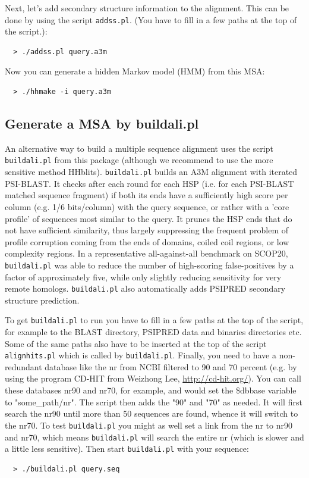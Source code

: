 \documentclass[11pt,a4paper]{article}
\begin{document}
Next, let's add secondary structure information to the alignment. This can be 
done by using the script \verb`addss.pl`. (You have to fill in a few paths at the top of the 
script.):

\begin{verbatim}
  > ./addss.pl query.a3m
\end{verbatim}

Now you can generate a hidden Markov model (HMM) from this MSA:
\begin{verbatim}
  > ./hhmake -i query.a3m
\end{verbatim}

\subsection{Generate a MSA by buildali.pl}

An alternative way to build a multiple sequence alignment uses the script \verb`buildali.pl` from this package (although we recommend to use
the more sensitive method HHblits). \verb`buildali.pl` builds an A3M alignment 
with iterated PSI-BLAST. It checks after each round for each HSP (i.e. for each PSI-BLAST 
matched sequence fragment) if both its ends have a sufficiently high score per column 
(e.g. 1/6 bits/column) with the query sequence, or rather with a 'core profile' of sequences 
most similar to the query. It prunes the HSP ends that do not have sufficient similarity, 
thus largely suppressing the frequent problem of profile corruption coming from the ends of 
domains, coiled coil regions, or low complexity regions. In a representative all-against-all 
benchmark on SCOP20, \verb`buildali.pl` was able to reduce the number of high-scoring 
false-positives by a factor of approximately five, while only slightly reducing sensitivity 
for very remote homologs. \verb`buildali.pl` also automatically adds PSIPRED secondary structure 
prediction. 

To get \verb`buildali.pl` to run you have to fill in a few paths at the top of the script, 
for example to the BLAST directory, PSIPRED data and binaries directories etc. Some of 
the same paths also have to be inserted at the top of the script \verb`alignhits.pl` which 
is called by \verb`buildali.pl`. Finally, you need to have a non-redundant database like the 
nr from NCBI filtered to 90 and 70 percent (e.g. by using the program CD-HIT from 
Weizhong Lee, \url{http://cd-hit.org/}). You can call these databases nr90 and nr70, for 
example, and would set the \$dbbase variable to "some\_path/nr". The script then adds 
the "90" and "70" as needed. It will first search the nr90 until more than 50 
sequences are found, whence it will switch to the nr70. To test \verb`buildali.pl` you might 
as well set a link from the nr to nr90 and nr70, which means \verb`buildali.pl` will search 
the entire nr (which is slower and a little less sensitive). Then start \verb`buildali.pl` 
with your sequence:
\begin{verbatim}
  > ./buildali.pl query.seq
\end{verbatim}
\end{document}
